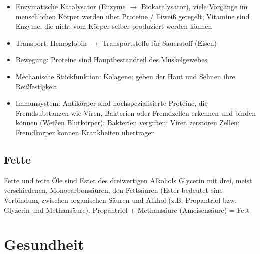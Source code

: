 \documentclass[a4paper]{article}
\begin{document}
\begin{itemize}
\item Enzymatische Katalysator (Enzyme $\rightarrow$ Biokatalysator), viele Vorgänge im menschlichen Körper werden über Proteine / Eiweiß geregelt; Vitamine sind Enzyme, die nicht vom Körper selber produziert werden können

\item Transport: Hemoglobin $\rightarrow$ Transportstoffe für Sauerstoff (Eisen)

\item Bewegung: Proteine sind Hauptbestandteil des Muskelgewebes

\item Mechanische Stückfunktion: Kolagene; geben der Haut und Sehnen ihre Reißfestigkeit

\item Immunsystem: Antikörper sind hochspezialisierte  Proteine, die Fremdsubstanzen wie Viren, Bakterien oder Fremdzellen erkennen und binden können (Weißen Blutkörper); Bakterien vergiften; Viren zerstören Zellen; Fremdkörper können Krankheiten übertragen

\end{itemize}

\subsection{Fette}

Fette und fette Öle sind Ester des dreiwertigen Alkohols Glycerin mit drei, meist verschiedenen, Monocarbonsäuren, den Fettsäuren (Ester bedeutet eine Verbindung zwischen organischen Säuren und Alkhol (z.B. Propantriol bzw. Glyzerin und Methansäure).
\newline
\newline
Propantriol + Methansäure (Ameisensäure) = Fett

\newpage

\section{Gesundheit}
\end{document}
